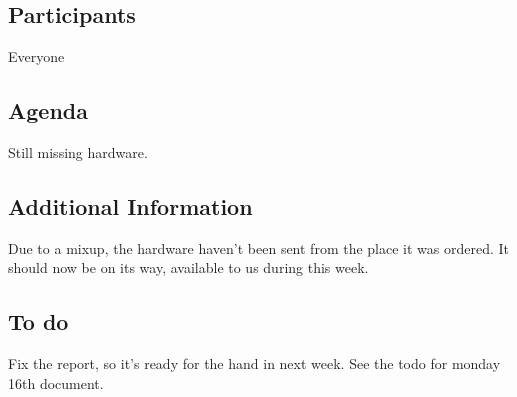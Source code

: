 \subsection{Participants}

Everyone

\subsection{Agenda}

Still missing hardware.


\subsection{Additional Information}

Due to a mixup, the hardware haven't been sent from the place it was ordered. It should now be on its way, available to us during this week.



\subsection{To do}

Fix the report, so it's ready for the hand in next week. See the todo for monday 16th document.